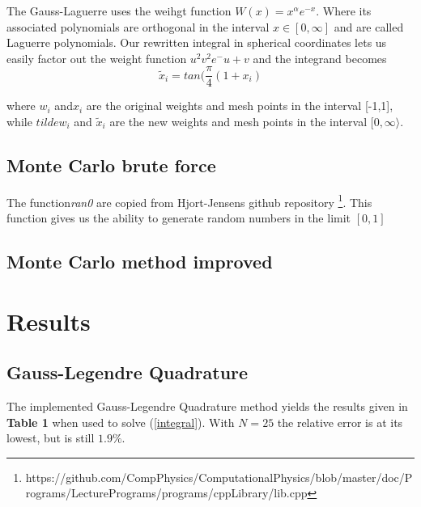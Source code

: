 \documentclass[twoside,twocolumn]{article}
\begin{document}
The Gauss-Laguerre uses the weihgt function $W(x)  = x^\alpha e^{-x}$. Where its associated polynomials are orthogonal in the interval $x\in[0,\infty]$ and are called Laguerre polynomials. Our rewritten integral in spherical coordinates lets us easily factor out the weight function $u^2v^2 e^-{u+v}$ and the integrand becomes
\begin{equation}
	\tilde{x}_i = tan(\frac{\pi}{4}(1+x_i)
\end{equation}



where $w_i$ and$x_i$ are the original weights and mesh points in the interval [-1,1], while $tilde{w}_i$ and $\tilde{x}_i$ are the new weights and mesh points in the interval $[0,\infty\rangle$.

\subsection{Monte Carlo brute force}
The function\textit{ran0}  are copied from Hjort-Jensens github repository \footnote{https://github.com/CompPhysics/ComputationalPhysics/blob/master/doc/Programs/LecturePrograms/programs/cppLibrary/lib.cpp}. This function gives us the ability to generate random numbers in the limit $[0,1]$
\subsection{Monte Carlo method improved}




\section{Results}


\subsection{Gauss-Legendre Quadrature}
The implemented Gauss-Legendre Quadrature method yields the results given in \textbf{Table 1} when used to solve (\ref{integral}). With $N=25$ the relative error is at its lowest, but is still $1.9 \%$.
\end{document}
